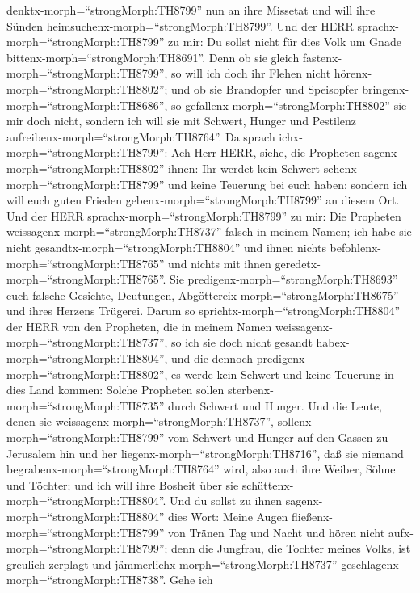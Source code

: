 denktx-morph=``strongMorph:TH8799'' nun an ihre Missetat und will ihre
Sünden heimsuchenx-morph=``strongMorph:TH8799''.  Und der
HERR sprachx-morph=``strongMorph:TH8799'' zu mir: Du sollst nicht für
dies Volk um Gnade bittenx-morph=``strongMorph:TH8691''. 
Denn ob sie gleich fastenx-morph=``strongMorph:TH8799'', so will ich
doch ihr Flehen nicht hörenx-morph=``strongMorph:TH8802''; und ob sie
Brandopfer und Speisopfer bringenx-morph=``strongMorph:TH8686'', so
gefallenx-morph=``strongMorph:TH8802'' sie mir doch nicht, sondern ich
will sie mit Schwert, Hunger und Pestilenz
aufreibenx-morph=``strongMorph:TH8764''.  Da sprach
ichx-morph=``strongMorph:TH8799'': Ach Herr HERR, siehe, die Propheten
sagenx-morph=``strongMorph:TH8802'' ihnen: Ihr werdet kein Schwert
sehenx-morph=``strongMorph:TH8799'' und keine Teuerung bei euch haben;
sondern ich will euch guten Frieden gebenx-morph=``strongMorph:TH8799''
an diesem Ort.  Und der HERR
sprachx-morph=``strongMorph:TH8799'' zu mir: Die Propheten
weissagenx-morph=``strongMorph:TH8737'' falsch in meinem Namen; ich habe
sie nicht gesandtx-morph=``strongMorph:TH8804'' und ihnen nichts
befohlenx-morph=``strongMorph:TH8765'' und nichts mit ihnen
geredetx-morph=``strongMorph:TH8765''. Sie
predigenx-morph=``strongMorph:TH8693'' euch falsche Gesichte, Deutungen,
Abgöttereix-morph=``strongMorph:TH8675'' und ihres Herzens Trügerei.
 Darum so sprichtx-morph=``strongMorph:TH8804'' der HERR
von den Propheten, die in meinem Namen
weissagenx-morph=``strongMorph:TH8737'', so ich sie doch nicht gesandt
habex-morph=``strongMorph:TH8804'', und die dennoch
predigenx-morph=``strongMorph:TH8802'', es werde kein Schwert und keine
Teuerung in dies Land kommen: Solche Propheten sollen
sterbenx-morph=``strongMorph:TH8735'' durch Schwert und Hunger.
 Und die Leute, denen sie
weissagenx-morph=``strongMorph:TH8737'',
sollenx-morph=``strongMorph:TH8799'' vom Schwert und Hunger auf den
Gassen zu Jerusalem hin und her liegenx-morph=``strongMorph:TH8716'',
daß sie niemand begrabenx-morph=``strongMorph:TH8764'' wird, also auch
ihre Weiber, Söhne und Töchter; und ich will ihre Bosheit über sie
schüttenx-morph=``strongMorph:TH8804''.  Und du sollst zu
ihnen sagenx-morph=``strongMorph:TH8804'' dies Wort: Meine Augen
fließenx-morph=``strongMorph:TH8799'' von Tränen Tag und Nacht und hören
nicht aufx-morph=``strongMorph:TH8799''; denn die Jungfrau, die Tochter
meines Volks, ist greulich zerplagt und
jämmerlichx-morph=``strongMorph:TH8737''
geschlagenx-morph=``strongMorph:TH8738''.  Gehe ich
